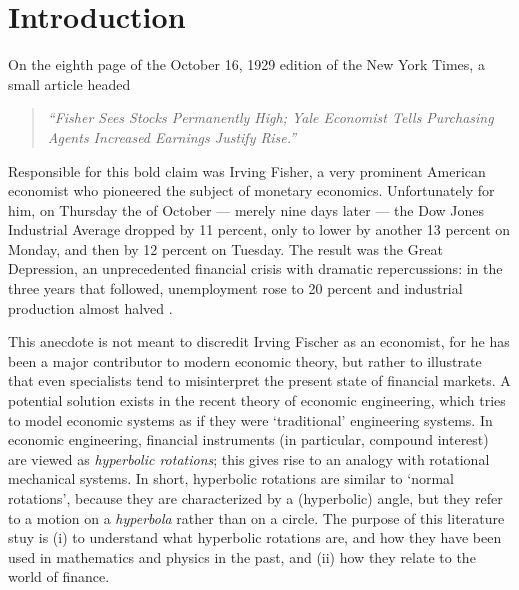 \chapter{Introduction}
\label{chap:intro}
On the eighth page of the October 16, 1929 edition of the New York Times, a small article headed
\begin{quote}
    \emph{``Fisher Sees Stocks Permanently High; Yale Economist Tells Purchasing Agents Increased Earnings Justify Rise.''}  \cite{NYT1929}
\end{quote}
Responsible for this bold claim was Irving Fisher, a very prominent American economist who pioneered  the subject of monetary economics. Unfortunately for him, on Thursday the  of October --- merely nine days later --- the Dow Jones Industrial Average dropped by 11 percent, only to lower by another 13 percent on Monday, and then by 12 percent on Tuesday. The result was the Great Depression, an unprecedented financial crisis with dramatic repercussions: in the three years that followed, unemployment rose to 20 percent and industrial production almost halved \cite{gdepression}. 
 
This anecdote is not meant to discredit Irving Fischer as an economist, for he has been a major contributor to modern economic theory, but rather to illustrate that even specialists tend to misinterpret the present state of financial markets. A potential solution exists in the recent theory of economic engineering, which tries to model economic systems as if they were `traditional' engineering systems. In economic engineering, financial instruments (in particular, compound interest) are viewed as \emph{hyperbolic rotations}; this gives rise to an analogy with rotational mechanical systems. In short, hyperbolic rotations are similar to `normal rotations', because they are characterized by a (hyperbolic) angle, but they refer to a motion on a \emph{hyperbola} rather than on a circle. The purpose of this literature stuy is (i) to understand what hyperbolic rotations are, and how they have been used in mathematics and physics in the past, and (ii) how they relate to the world of finance. 

